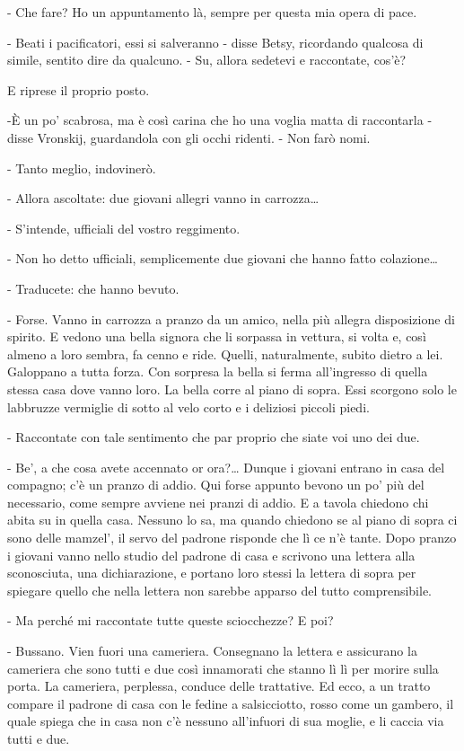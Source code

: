 - Che fare? Ho un appuntamento là, sempre per questa mia opera di pace. 

- Beati i pacificatori, essi si salveranno - disse Betsy, ricordando qualcosa di simile, sentito dire da qualcuno. - Su, allora sedetevi e raccontate, cos'è? 

E riprese il proprio posto. 

-È un po' scabrosa, ma è così carina che ho una voglia matta di raccontarla - disse Vronskij, guardandola con gli occhi ridenti. - Non farò nomi. 

- Tanto meglio, indovinerò. 

- Allora ascoltate: due giovani allegri vanno in carrozza\ldots{} 

- S'intende, ufficiali del vostro reggimento. 

- Non ho detto ufficiali, semplicemente due giovani che hanno fatto colazione\ldots{} 

- Traducete: che hanno bevuto. 

- Forse. Vanno in carrozza a pranzo da un amico, nella più allegra disposizione di spirito. E vedono una bella signora che li sorpassa in vettura, si volta e, così almeno a loro sembra, fa cenno e ride. Quelli, naturalmente, subito dietro a lei. Galoppano a tutta forza. Con sorpresa la bella si ferma all'ingresso di quella stessa casa dove vanno loro. La bella corre al piano di sopra. Essi scorgono solo le labbruzze vermiglie di sotto al velo corto e i deliziosi piccoli piedi. 

- Raccontate con tale sentimento che par proprio che siate voi uno dei due. 

- Be', a che cosa avete accennato or ora?\ldots{} Dunque i giovani entrano in casa del compagno; c'è un pranzo di addio. Qui forse appunto bevono un po' più del necessario, come sempre avviene nei pranzi di addio. E a tavola chiedono chi abita su in quella casa. Nessuno lo sa, ma quando chiedono se al piano di sopra ci sono delle mamzel', il servo del padrone risponde che lì ce n'è tante. Dopo pranzo i giovani vanno nello studio del padrone di casa e scrivono una lettera alla sconosciuta, una dichiarazione, e portano loro stessi la lettera di sopra per spiegare quello che nella lettera non sarebbe apparso del tutto comprensibile. 

- Ma perché mi raccontate tutte queste sciocchezze? E poi? 

- Bussano. Vien fuori una cameriera. Consegnano la lettera e assicurano la cameriera che sono tutti e due così innamorati che stanno lì lì per morire sulla porta. La cameriera, perplessa, conduce delle trattative. Ed ecco, a un tratto compare il padrone di casa con le fedine a salsicciotto, rosso come un gambero, il quale spiega che in casa non c'è nessuno all'infuori di sua moglie, e li caccia via tutti e due. 

